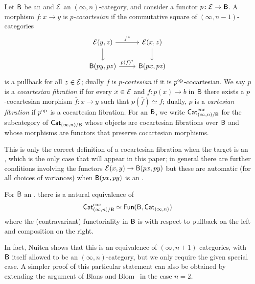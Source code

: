 \documentclass[a4paper,11pt]{article}
\begin{document}
\begin{defn}
  Let $\textup{\textsf{B}}$ be an \icat{} and $\mathcal{E}$ an $(\infty,n)$-category, and
  consider a functor $p \colon \eE \to \oB$. A morphism
  $f \colon x \to y$ is \emph{$p$-cocartesian} if the commutative
  square of $(\infty,n-1)$-categories
  \[
    \begin{tikzcd}
      \eE(y, z) \ar[r, "f^{*}"] \ar[d] & \eE(x,z) \ar[d] \\
      \oB(py,pz) \ar[r, "p(f)^{*}"] & \oB(px,pz)
    \end{tikzcd}
  \]
  is a pullback for all $z \in \mathcal{E}$; dually $f$ is \emph{$p$-cartesian}
  if it is $p^{\text{\textup{op}}}$-cocartesian. We say $p$ is a \emph{cocartesian
    fibration} if for every $x \in \mathcal{E}$ and $f \colon p(x) \to b$ in
  $\textup{\textsf{B}}$ there exists a $p$-cocartesian morphism
  $\bar{f} \colon x \to y$ such that $p(\bar{f}) \simeq f$; dually,
  $p$ is a \emph{cartesian fibration} if $p^{\text{\textup{op}}}$ is a cocartesian
  fibration. For an \icat{} $\textup{\textsf{B}}$, we write $\textup{\textsf{Cat}}_{(\infty,n)/\textup{\textsf{B}}}^{\text{\textup{coc}}}$ for
  the subcategory of $\textup{\textsf{Cat}}_{(\infty,n)/\textup{\textsf{B}}}$ whose objects are cocartesian
  fibrations over $\textup{\textsf{B}}$ and whose morphisms are functors that preserve
  cocartesian morphisms.
\end{defn}

\begin{warning}
  This is only the correct definition of a cocartesian fibration when
  the target is an \icat{}, which is the only case that will appear in
  this paper; in general there are further conditions involving the
  functors $\eE(x,y) \to \oB(px,py)$ but these are automatic (for all
  choices of variances) when $\textup{\textsf{B}}(px,py)$ is an \igpd{}.
\end{warning}


\begin{thm}\label{thm:str fib incat}
  For $\textup{\textsf{B}}$ an \icat{}, there is a natural equivalence of \icats{}
  \[\textup{\textsf{Cat}}_{(\infty,n)/\textup{\textsf{B}}}^{\text{\textup{coc}}} \simeq \textup{\textsf{Fun}}(\textup{\textsf{B}}, \textup{\textsf{Cat}}_{(\infty,n)})\]
  where the (contravariant) functoriality in $\textup{\textsf{B}}$ is with respect to pullback on the left and composition on the right.
\end{thm}

\begin{remark}
  In fact, Nuiten shows that this is an equivalence of
  $(\infty,n+1)$-categories, with $\textup{\textsf{B}}$ itself allowed to be an
  $(\infty,n)$-category, but we only require the given special case. A
  simpler proof of this particular statement can also be obtained by
  extending the argument of
  Blans and Blom~\cite[Proposition A.2.9]{BlansBlom} in the case $n=2$.
\end{remark}
\end{document}
